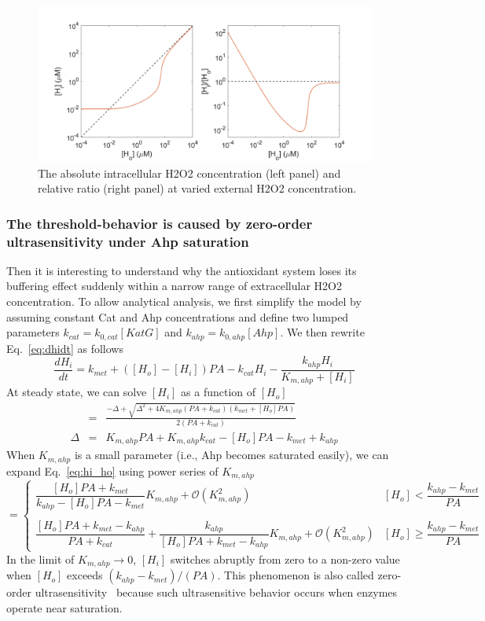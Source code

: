\documentclass[10pt]{article}
\begin{document}
\begin{figure}[H]
\centering
  \includegraphics[width=0.85\linewidth]{Hin_Hout_relation.png}
  \caption{The absolute intracellular H2O2 concentration (left panel) and relative ratio (right panel) at varied external H2O2 concentration.}
  \label{fig:Hin_Hout_relation}
\end{figure}

\subsubsection{The threshold-behavior is caused by zero-order ultrasensitivity under Ahp saturation}

Then it is interesting to understand why the antioxidant system loses its buffering effect suddenly within a narrow range of extracellular H2O2 concentration. To allow analytical analysis, we first simplify the model by assuming constant Cat and Ahp concentrations and define two lumped parameters $k_{cat}=k_{0,cat}[KatG]$ and $k_{ahp}=k_{0,ahp}[Ahp]$. We then rewrite Eq.~\ref{eq:dhidt} as follows
\begin{equation}
\frac{dH_i}{dt} = k_{met}+([H_o]-[H_i])PA -k_{cat}H_i- \dfrac{k_{ahp}H_i}{K_{m,ahp}+[H_i]}
\end{equation}
 At steady state, we can solve $[H_i]$ as a function of $[H_o]$
\begin{eqnarray}
[H_i] &=& \frac{-\Delta +\sqrt{\Delta^2+4K_{m,ahp}(PA+k_{cat})(k_{met}+[H_o]PA)}}{2(PA+k_{cat})}  \label{eq:hi_ho}\\
\Delta &=& K_{m,ahp}PA+K_{m,ahp}k_{cat}-[H_o]PA-k_{met}+k_{ahp}
\end{eqnarray}
When $K_{m,ahp}$ is a small parameter (i.e., Ahp becomes saturated easily), we can expand Eq.~\ref{eq:hi_ho} using power series of $K_{m,ahp}$
\begin{equation*}
[H_i] = \begin{cases}
\dfrac{[H_o]PA+k_{met}}{k_{ahp}-[H_o]PA-k_{met}}K_{m,ahp} + \mathcal{O}(K_{m,ahp}^2) & \text{$[H_o]<\dfrac{k_{ahp}-k_{met}}{PA}$}\\
\\
\dfrac{[H_o]PA+k_{met}-k_{ahp}}{PA+k_{cat}} + \dfrac{k_{ahp}}{[H_o]PA+k_{met}-k_{ahp}}K_{m,ahp} + \mathcal{O}(K_{m,ahp}^2) &  \text{$[H_o]\ge\dfrac{k_{ahp}-k_{met}}{PA}$}
\end{cases}
\end{equation*}
In the limit of $K_{m,ahp}\to0$, $[H_i]$ switches abruptly from zero to a non-zero value when $[H_o]$ exceeds $(k_{ahp}-k_{met})/(PA)$. This phenomenon is also called zero-order ultrasensitivity~\cite{ferrell2014ultrasensitivity} because such ultrasensitive behavior occurs when enzymes operate near saturation.
\end{document}
